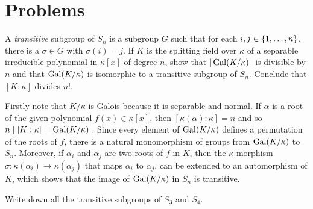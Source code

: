 \section{Problems}

\begin{probl}
    A \textsl{transitive} subgroup of\/ $S_n$ is a subgroup\/ $G$ such that for each\/ $i, j \in \{1, \dots, n\}$, there is a\/ $\sigma \in G$ with\/ $\sigma(i) = j$. If\/ $K$ is the splitting field over\/ $\kappa$ of a separable irreducible polynomial in\/ $\kappa[x]$ of degree\/ $n$, show that\/ $|\operatorname{Gal}(K/\kappa)|$ is divisible by\/ $n$ and that\/ $\operatorname{Gal}(K/\kappa)$ is isomorphic to a transitive subgroup of\/ $S_n$. Conclude that\/ $[K : \kappa]$ divides\/ $n!$.
\end{probl}

\begin{solution}
    Firstly note that $K/\kappa$ is Galois because it is separable and normal. If $\alpha$ is a root of the given polynomial $f(x)\in\kappa[x]$, then $[\kappa(\alpha):\kappa]=n$ and so $n\mid[K:\kappa]=\operatorname{Gal}(K/\kappa)|$. Since every element of $\operatorname{Gal}(K/\kappa)$ defines a permutation of the roots of $f$, there is a natural monomorphism of groups from $\operatorname{Gal}(K/\kappa)$ to $S_n$. Moreover, if $\alpha_i$ and $\alpha_j$ are two roots of $f$ in $K$, then the $\kappa$-morphism $\sigma\colon\kappa(\alpha_i)\to\kappa(\alpha_j)$ that maps $\alpha_i$ to $\alpha_j$, can be extended to an automorphism of $K$, which shows that the image of $\operatorname{Gal}(K/\kappa)$ in $S_n$ is transitive. 
\end{solution}

\begin{probl}
    Write down all the transitive subgroups of\/ $S_3$ and\/ $S_4$.
\end{probl}

